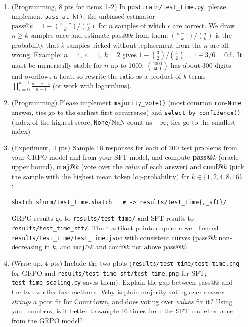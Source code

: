 \documentclass[11pt]{article}
\newcommand{\file}[1]{\texttt{#1}}
\begin{document}
\begin{enumerate}
  \item (Programming, 8 pts for items 1--2) In \file{posttrain/test\_time.py}, please implement
        \texttt{pass\_at\_k()}, the unbiased estimator~\cite{codex} $\text{pass@}k = 1 - \binom{n-c}{k}\big/\binom{n}{k}$ for $n$ samples of which $c$ are
        correct. We draw $n \ge k$ samples once and estimate pass@$k$ from them: $\binom{n-c}{k}/\binom{n}{k}$ is the
        probability that $k$ samples picked without replacement from the $n$ are all wrong. Example: $n=4$, $c=1$,
        $k=2$ gives $1 - \binom{3}{2}/\binom{4}{2} = 1 - 3/6 = 0.5$. It must be numerically stable for $n$ up to
        1000: $\binom{1000}{500}$ has about 300 digits and overflows a float, so rewrite the ratio as a product of
        $k$ terms $\prod_{i=0}^{k-1}\frac{n-c-i}{n-i}$ (or work with logarithms).
  \item (Programming) Please implement \texttt{majority\_vote()} (most common non-\texttt{None} answer, ties go to
        the earliest first occurrence) and \texttt{select\_by\_confidence()} (index of the highest score;
        \texttt{None}/NaN count as $-\infty$; ties go to the smallest index).
  \item (Experiment, 4 pts) Sample 16 responses for each of 200 test problems from your GRPO model and from your SFT
        model, and compute \textbf{pass@$k$} (oracle upper bound), \textbf{maj@$k$} (vote over the \emph{value} of
        each answer) and \textbf{conf@$k$} (pick the sample with the highest mean token log-probability) for
        $k\in\{1,2,4,8,16\}$:
\begin{lstlisting}
sbatch slurm/test_time.sbatch   # -> results/test_time{,_sft}/\end{lstlisting}
        GRPO results go to \file{results/test\_time/} and SFT results to \file{results/test\_time\_sft/}.
        The 4 artifact points require a well-formed \file{results/test\_time/test\_time.json} with consistent
        curves (pass@$k$ non-decreasing in $k$, and maj@$k$ and conf@$k$ not above pass@$k$).
  \item (Write-up, 4 pts) Include the two plots (\file{results/test\_time/test\_time.png} for GRPO and
        \file{results/test\_time\_sft/test\_time.png} for SFT; \file{test\_time\_scaling.py} saves them). Explain the gap between pass@$k$ and the two verifier-free
        methods. Why is plain majority voting over answer \emph{strings} a poor fit for Countdown, and does voting
        over \emph{values} fix it? Using your numbers, is it better to sample 16 times from the SFT model or once
        from the GRPO model?
\end{enumerate}
\end{document}
